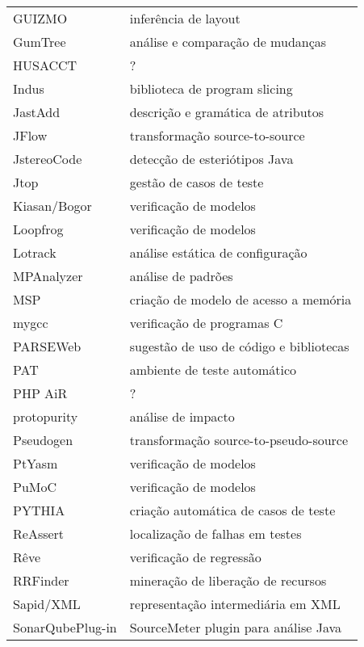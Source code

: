 \begin{table}[h]
{\begin{tabular}{| l | l |}
  GUIZMO         & inferência de layout                 \\
  GumTree        & análise e comparação de mudanças     \\
  HUSACCT        & ?                                    \\
  Indus          & biblioteca de program slicing        \\
  JastAdd        & descrição e gramática de atributos   \\
  JFlow          & transformação source-to-source       \\
  JstereoCode    & detecção de esteriótipos Java        \\
  Jtop           & gestão de casos de teste             \\
  Kiasan/Bogor   & verificação de modelos               \\
  Loopfrog       & verificação de modelos               \\
  Lotrack        & análise estática de configuração     \\
  MPAnalyzer     & análise de padrões                   \\
  MSP            & criação de modelo de acesso a memória\\
  mygcc          & verificação de programas C           \\
  PARSEWeb       & sugestão de uso de código e bibliotecas \\
  PAT            & ambiente de teste automático         \\
  PHP AiR        & ?                                    \\
  protopurity    & análise de impacto                   \\
  Pseudogen      & transformação source-to-pseudo-source\\
  PtYasm         & verificação de modelos               \\
  PuMoC          & verificação de modelos               \\
  PYTHIA         & criação automática de casos de teste \\
  ReAssert       & localização de falhas em testes      \\
  Rêve           & verificação de regressão             \\
  RRFinder       & mineração de liberação de recursos   \\
  Sapid/XML      & representação intermediária em XML   \\
  SonarQubePlug-in & SourceMeter plugin para análise Java \\

\end{tabular}}
\end{table}
